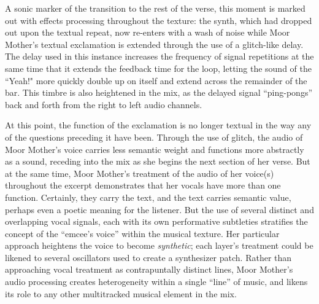 A sonic marker of the transition to the rest of the verse, this moment is marked out with effects 
processing throughout the texture: the synth, which had dropped out upon the textual repeat, now
re-enters with a wash of noise while Moor Mother's textual exclamation is extended through the 
use of a glitch-like delay. The delay used in this instance increases the frequency of signal 
repetitions at the same time that it extends the feedback time for the loop, letting the sound
of the ``Yeah!" more quickly double up on itself and extend across the remainder of the bar. This
timbre is also heightened in the mix, as the delayed signal ``ping-pongs'' back and forth from 
the right to left audio channels.

At this point, the function of the exclamation is no longer textual in the way any of the questions
preceding it have been. Through the use of glitch, the audio of Moor Mother's voice carries less 
semantic weight and functions more abstractly as a sound, receding into the mix as she begins the
next section of her verse. But at the same time, Moor Mother's treatment of the audio of her voice(s)
throughout the excerpt demonstrates that her vocals have more than one function. Certainly, they carry
the text, and the text carries semantic value, perhaps even a poetic meaning for the listener. But the
use of several distinct and overlapping vocal signals, each with its own performative subtleties 
stratifies the concept of the ``emcee's voice'' within the musical texture. Her particular approach
heightens the voice to become \emph{synthetic}; each layer's treatment could be likened to several
oscillators used to create a synthesizer patch. Rather than approaching vocal treatment as 
contrapuntally distinct lines, Moor Mother's audio processing creates heterogeneity within a single
``line'' of music, and likens its role to any other multitracked musical element in the mix.